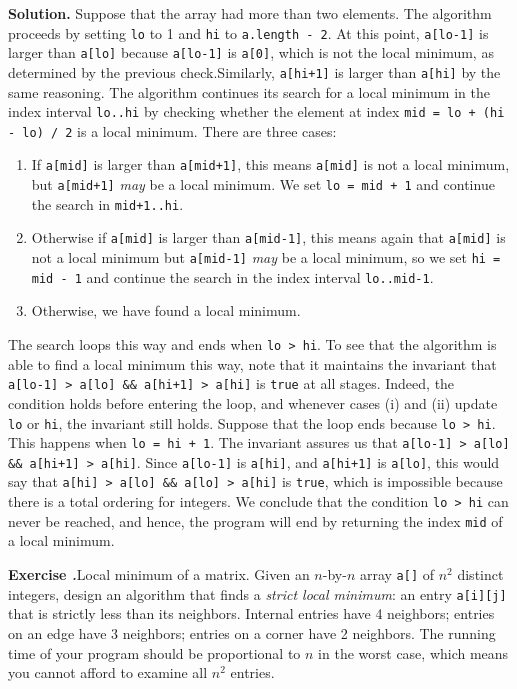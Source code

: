 \documentclass[12pt, a4paper]{article}
\newenvironment{ex}[2][Exercise]
{\par\medskip\noindent \textbf{#1 #2.}}
{\medskip}
\newenvironment{sol}[1][Solution]
{\par\medskip\noindent \textbf{#1.} }
{\medskip}
\begin{document}
\begin{sol}
		Suppose that the array had more than two elements. The algorithm proceeds by setting
		\texttt{lo} to 1 and \texttt{hi} to \texttt{a.length - 2}. At this point, \texttt{a[lo-1]}
		is larger than \texttt{a[lo]} because \texttt{a[lo-1]} is \texttt{a[0]}, which is not
		the local minimum, as determined by the previous check.Similarly, \texttt{a[hi+1]} is
		larger than \texttt{a[hi]} by the same reasoning. The algorithm continues its search
		for a local minimum in the index interval \texttt{lo..hi} by checking whether
		the element at index \texttt{mid = lo + (hi - lo) / 2} is a local minimum. There are
		three cases:
		\begin{enumerate}[label=(\roman*)]
			\item If \texttt{a[mid]} is larger than \texttt{a[mid+1]}, this means \texttt{a[mid]}
			is not a local minimum, but \texttt{a[mid+1]} \emph{may} be a local minimum.
			We set \texttt{lo = mid + 1} and continue the search in \texttt{mid+1..hi}.
			\item Otherwise if \texttt{a[mid]} is larger than \texttt{a[mid-1]}, this
			means again that \texttt{a[mid]} is not a local minimum but \texttt{a[mid-1]}
			\emph{may} be a local minimum, so we set \texttt{hi = mid - 1} and continue the
			search in the index interval \texttt{lo..mid-1}.
			\item Otherwise, we have found a local minimum.
		\end{enumerate}
		The search loops this way and ends when \texttt{lo > hi}. To see that the algorithm is
		able to find a local minimum this way, note that it maintains the invariant that
		\texttt{a[lo-1] > a[lo] \&\& a[hi+1] > a[hi]} is \texttt{true} at all stages.
		Indeed, the condition holds before entering the loop, and whenever cases (i) and (ii)
		update \texttt{lo} or \texttt{hi}, the invariant still holds. Suppose that the loop
		ends because \texttt{lo > hi}. This happens when \texttt{lo = hi + 1}. The invariant
		assures us that \texttt{a[lo-1] > a[lo] \&\& a[hi+1] > a[hi]}. Since \texttt{a[lo-1]} is
		\texttt{a[hi]}, and \texttt{a[hi+1]} is \texttt{a[lo]}, this would say that
		\texttt{a[hi] > a[lo] \&\& a[lo] > a[hi]} is \texttt{true}, which is impossible
		because there is a total ordering for integers. We conclude that the condition
		\texttt{lo > hi} can never be reached, and hence, the program will end by returning
		the index \texttt{mid} of a local minimum.
	\end{sol}
	\begin{ex}{19}
		\emph{Local minimum of a matrix}. Given an $n$-by-$n$ array \texttt{a[]} of $n^2$ distinct
		integers, design an algorithm that finds a \emph{strict local minimum}: an entry
		\texttt{a[i][j]} that is strictly less than its neighbors. Internal entries have 4 neighbors;
		entries on an edge have 3 neighbors; entries on a corner have 2 neighbors. The running time
		of your program should be proportional to $n$ in the worst case, which means you cannot
		afford to examine all $n^2$ entries.
	\end{ex}
	
\end{document}
